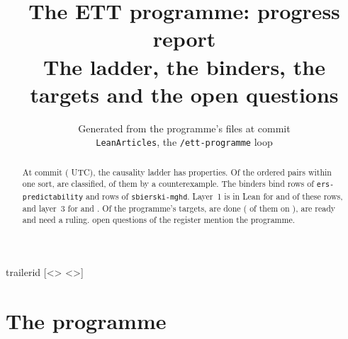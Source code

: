 

\edef\progTrailerId{[<\progPdfId> <\progPdfId>]}
\pdfvariable trailerid \expandafter{\progTrailerId}
\newcommand{\gen}[1]{\csname @@input\endcsname generated/#1 }

\title{The ETT programme: progress report\\[2pt]
\large The ladder, the binders, the targets and the open questions}
\author{Generated from the programme's files at commit \texttt{\progRev}\\
\small \texttt{LeanArticles}, the \texttt{/ett-programme} loop}
\date{\progRevDate}


\maketitle

\begin{abstract}
At commit \texttt{\progRev} (\progRevTime{} UTC), the causality ladder has \numLadderProperties{}
properties. Of the \numLadderWithin{} ordered pairs within one sort, \numLadderClassified{} are
classified, \numLadderClassFails{} of them by a counterexample. The \numBinders{} binders bind
\numBinderErsPredictabilityRows{} rows of \texttt{ers-predictability} and
\numBinderSbierskiMghdRows{} rows of \texttt{sbierski-mghd}. Layer~1 is in Lean for
\numBinderErsPredictabilityLayerOneLean{} and \numBinderSbierskiMghdLayerOneLean{} of these rows,
and layer~3 for \numBinderErsPredictabilityLayerThreeLeanRows{} and
\numBinderSbierskiMghdLayerThreeLeanRows{}. Of the programme's \numTargets{} targets,
\numTargetsDone{} are done (\numTargetsDoneOnRevDate{} of them on \progRevDate), \numTargetsReady{}
are ready and \numTargetsNeedsRuling{} need a ruling. \numOqOpen{} open questions of the register
mention the programme.
\end{abstract}

\tableofcontents

\section{The programme}

